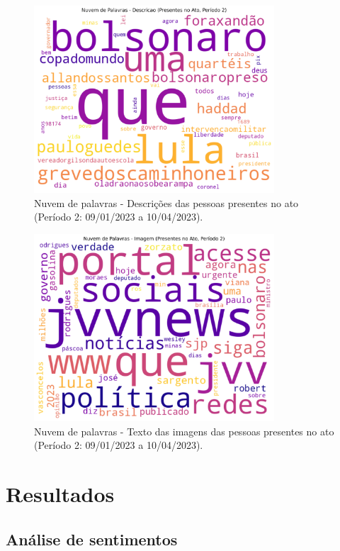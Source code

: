 \documentclass[manuscript,screen,review]{acmart}
\begin{document}
\begin{figure}[h]
\centering
\includegraphics[width=0.8\textwidth]{figura23_nuvem_presentes_desc_periodo2.png}
\caption{Nuvem de palavras - Descrições das pessoas presentes no ato (Período 2: 09/01/2023 a 10/04/2023).}
\label{fig:figura23}
\end{figure}

\begin{figure}[h]
\centering
\includegraphics[width=0.8\textwidth]{figura24_nuvem_presentes_img_periodo2.png}
\caption{Nuvem de palavras - Texto das imagens das pessoas presentes no ato (Período 2: 09/01/2023 a 10/04/2023).}
\label{fig:figura24}
\end{figure}

\section{Resultados}

\subsection{Análise de sentimentos}
\end{document}
